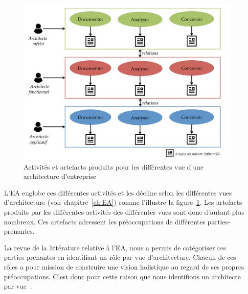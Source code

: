 \begin{figure}[!ht]
     \begin{center}
    \includegraphics[width=1\textwidth]{figures/4_demarche/pratique_courante_ea.pdf}
     \end{center}
     \caption{Activités et artefacts produits pour les différentes vue d'une architecture d'entreprise}
     \label{fig:limites_ea}
\end{figure}

L'EA englobe ces différentes activités et les décline selon les différentes
vues d'architecture (voir chapitre~\ref{ch:EA}) comme l'illustre la
figure~\ref{fig:limites_ea}. Les artefacts produits par les différentes
activités des différentes vues sont donc d'autant plus nombreux. Ces artefacts
adressent les préoccupations de différentes parties-prenantes.

La revue de la littérature relative à l'EA, nous a permis de catégoriser ces
parties-prenantes en identifiant un rôle par vue d'architecture. Chacun de ces
rôles a pour mission de construire une vision holistique au regard de ses
propres préoccupations. C'est donc pour cette raison que nous identifions un
architecte par vue~:


